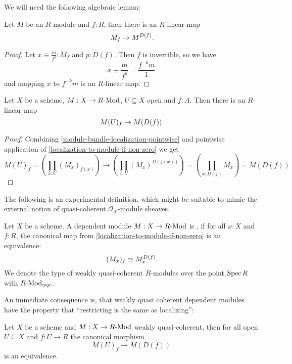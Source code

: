 We will need the following algebraic lemma:

\begin{lemma}%
  \label{localization-to-module-if-non-zero}
  Let $M$ be an $R$-module and $f:R$,
  then there is an $R$-linear map
  \[
    M_f\to M^{D(f)}
    \rlap{.}
  \]
\end{lemma}

\begin{proof}
  Let $x\equiv \frac{m}{f^k}:M_f$ and $p:D(f)$.
  Then $f$ is invertible, so we have
  \[
    x\equiv \frac{m}{f^k}=\frac{f^{-k}m}{1}
  \]
  and mapping $x$ to $f^{-k}m$ is an $R$-linear map.
  
\end{proof}

\begin{lemma}%
  \label{localization-to-restriction}                    
  Let $X$ be a scheme, $M:X\to R\text{-}\mathrm{Mod}$, $U\subseteq X$ open and $f:A$.
  Then there is an $R$-linear map
  \[
    M(U)_f \to M(D(f)) 
    \rlap{.}
  \]
\end{lemma}

\begin{proof}
  Combining \cref{module-bundle-localization-pointwise}
  and pointwise application of \cref{localization-to-module-if-non-zero} we get
  \[
    M(U)_f=\left(\prod_{x:U}(M_x)_{f(x)}\right)\to \left(\prod_{x:U}(M_x)^{D(f(x))}\right)
    =\left(\prod_{x:D(f)}M_x\right)
    =M(D(f))
  \]
\end{proof}

The following is an experimental definition,
which might be suitable
to mimic the external notion of quasi-coherent $\mathcal O_X$-module sheaves.

\begin{definition}%
  \label{quasi-coherent-bundle}
  Let $X$ be a scheme.
  A dependent module $M:X\to R\text{-}\mathrm{Mod}$ is ,
  if for all $x:X$ and $f:R$,
  the canonical map from \cref{localization-to-module-if-non-zero} is an equivalence:
  \[
    (M_x)_f\simeq M_x^{D(f)}
    \rlap{.}
  \]
  We denote the type of weakly quasi-coherent $R$-modules
  over the point $\operatorname{Spec} R$ with $R\text{-}\mathrm{Mod}_{wqc}$.
\end{definition}

An immediate consequence is, that
weakly quasi coherent dependent modules have
the property that ``restricting is the same as localizing'':

\begin{lemma}
  \label{weakly-quasi-coherent-open-localization}
  Let $X$ be a scheme and $M:X\to R\text{-}\mathrm{Mod}$ weakly quasi-coherent,
  then for all open $U\subseteq X$ and $f:U\to R$
  the canonical morphism
  \[
    M(U)_f\to M(D(f))
  \]
  is an equivalence.
\end{lemma}


